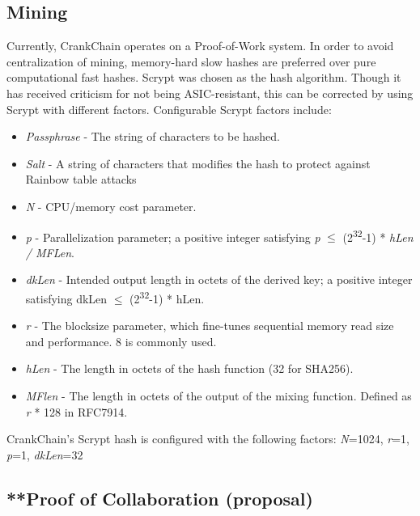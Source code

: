 \documentclass[10pt,twocolumn]{article}
\begin{document}
\subsection{Mining}
Currently, CrankChain operates on a Proof-of-Work system.  In order to avoid centralization of mining, memory-hard slow hashes are preferred over pure computational fast hashes. Scrypt was chosen as the hash algorithm.  Though it has received criticism for not being ASIC-resistant, this can be corrected by using Scrypt with different factors.  Configurable Scrypt factors include:
\begin{itemize}
\item \textit{Passphrase} - The string of characters to be hashed.
\item \textit{Salt} - A string of characters that modifies the hash to protect against Rainbow table attacks
\item \textit{N} - CPU/memory cost parameter.
\item \textit{p} - Parallelization parameter; a positive integer satisfying \textit{p} $\leq$ (2\textsuperscript{32}-1) * \textit{hLen / MFLen}.
\item \textit{dkLen} - Intended output length in octets of the derived key; a positive integer satisfying dkLen $\leq$ (2\textsuperscript{32}-1) * hLen.
\item \textit{r} - The blocksize parameter, which fine-tunes sequential memory read size and performance. 8 is commonly used.
\item \textit{hLen} - The length in octets of the hash function (32 for SHA256).
\item \textit{MFlen} - The length in octets of the output of the mixing function. Defined as \textit{r} * 128 in RFC7914.
\end{itemize}
 CrankChain's Scrypt hash is configured with the following factors: \textit{N}=1024, \textit{r}=1, \textit{p}=1, \textit{dkLen}=32
\subsection{**Proof of Collaboration (proposal)}
\end{document}
